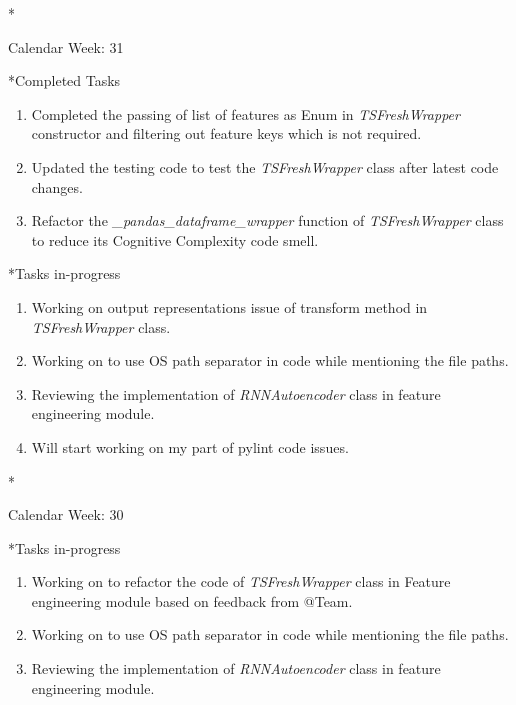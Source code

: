 \documentclass[11pt,a4paper]{article}
\begin{document}
\newpage
\begin{section}*{Calendar Week: 31 \hfill \date{06 August, 2021}}
 \begin{subsection}*{Completed Tasks}
     \begin{enumerate}
         \item Completed the passing of list of features as Enum in \textit{TSFreshWrapper} constructor and filtering out feature keys which is not required.
         \item Updated the testing code to test the \textit{TSFreshWrapper} class after latest code changes.
         \item Refactor the \textit{\_pandas\_dataframe\_wrapper} function of \textit{TSFreshWrapper} class to reduce its Cognitive Complexity code smell.
     \end{enumerate}
 \end{subsection}
 \begin{subsection}*{Tasks in-progress}
     \begin{enumerate}
         \item Working on output representations issue of transform method in \textit{TSFreshWrapper} class.
         \item Working on to use OS path separator in code while mentioning the file paths.
         \item Reviewing the implementation of \textit{RNNAutoencoder} class in feature engineering module.
         \item Will start working on my part of pylint code issues.
     \end{enumerate}
 \end{subsection}
\end{section}

\newpage
\begin{section}*{Calendar Week: 30 \hfill \date{30 July, 2021}}
 \begin{subsection}*{Tasks in-progress}
     \begin{enumerate}
         \item Working on to refactor the code of \textit{TSFreshWrapper} class in Feature engineering module based on feedback from @Team.
         \item Working on to use OS path separator in code while mentioning the file paths.
         \item Reviewing the implementation of \textit{RNNAutoencoder} class in feature engineering module.
     \end{enumerate}
 \end{subsection}
\end{section}
\end{document}
